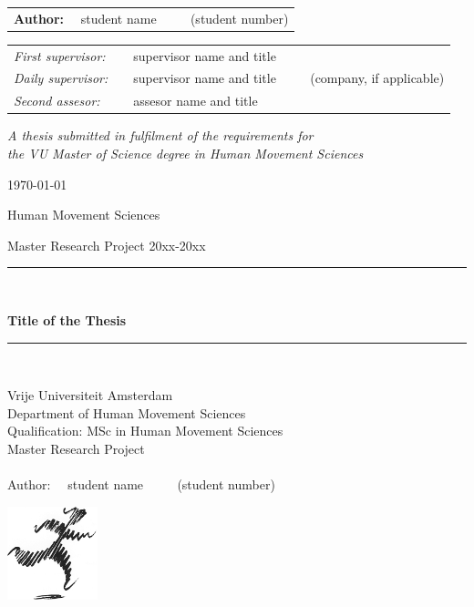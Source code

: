 \documentclass[openany,11pt]{Latex/classes/PhDthesisPSnPDF}
\begin{document}
\begin{center}
		{\Large
			\begin{tabular}{l}
				{\bf Author:} ~~student name ~~~~ (student number)
			\end{tabular}
		}
		
		\vspace*{2cm}
		
		\begin{tabular}{ll}
			{\it First supervisor:}   & ~~supervisor name and title \\
			{\it Daily supervisor:} & ~~supervisor name and title ~~~~ (company, if applicable) \\
			{\it Second assesor:}       & ~~assesor name and title
		\end{tabular}
		
		\vspace*{2.5cm}
		
		\textit{A thesis submitted in fulfilment of the requirements for\\ the VU Master of Science degree in Human Movement Sciences}
		
		\vspace*{1.8cm}
		
		\today\\[4cm] %
		
	\end{center}
	
	\newpage
	
	
		{\LARGE Human Movement Sciences}
		
		{\Large Master Research Project 20xx-20xx}
		
		\vspace*{1.5cm}
		
		\rule{.9\linewidth}{.6pt}\\[0.4cm]
		{\huge \bfseries Title of the Thesis \par}\vspace{0.4cm}
		\rule{.9\linewidth}{.6pt}\\[5cm]
		
		\begin{minipage}{0.6\textwidth}
			Vrije Universiteit Amsterdam\\
			Department of Human Movement Sciences\\
			Qualification: MSc in Human Movement Sciences\\
			Master Research Project\\
			\\
			Author: ~~student name ~~~~ (student number)
		\end{minipage}
		\begin{minipage}{0.2\textwidth}
			\raggedleft
			\includegraphics[height=27mm]{frontmatter/figures/HMS}
		\end{minipage}
	
\end{document}
